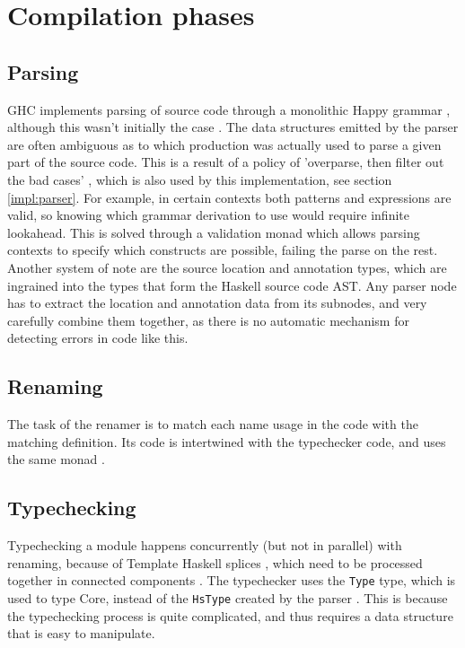 \documentclass[en]{pracamgr}
\newcommand{\code}[1]{\lstinline[breaklines=true]{#1}}
\begin{document}
\section{Compilation phases}
\subsection{Parsing}\label{ghc:parsing}
GHC implements parsing of source code through a monolithic Happy grammar \cite{Happy}, although this wasn't initially the case \cite{Jones1993TheGH}.
The data structures emitted by the parser are often ambiguous as to which production was actually used to parse a given part of the source code.
This is a result of a policy of 'overparse, then filter out the bad cases' \cite{ParserWiki}, 
which is also used by this implementation, see section \ref{impl:parser}.
For example, in certain contexts both patterns and expressions are valid, so knowing which grammar derivation to use would require infinite lookahead.
This is solved through a validation monad which allows parsing contexts to specify which constructs are possible, failing the parse on the rest.
Another system of note are the source location and annotation types, which are ingrained into the types that form the Haskell source code AST.
Any parser node has to extract the location and annotation data from its subnodes, and very carefully combine them together,
as there is no automatic mechanism for detecting errors in code like this.

\subsection{Renaming}
The task of the renamer is to match each name usage in the code with the matching definition. 
Its code is intertwined with the typechecker code, and uses the same monad \cite{RenamerWiki}.

\subsection{Typechecking}
Typechecking a module happens concurrently (but not in parallel) with renaming, because of Template Haskell splices \cite{TemplateHaskellDocs},
which need to be processed together in connected components \cite{TypecheckerWiki}.
The typechecker uses the \code{Type} type, which is used to type Core, instead of the \code{HsType} created by the parser \cite{TypecheckerWiki}.
This is because the typechecking process is quite complicated, and thus requires a data structure that is easy to manipulate.
\end{document}
